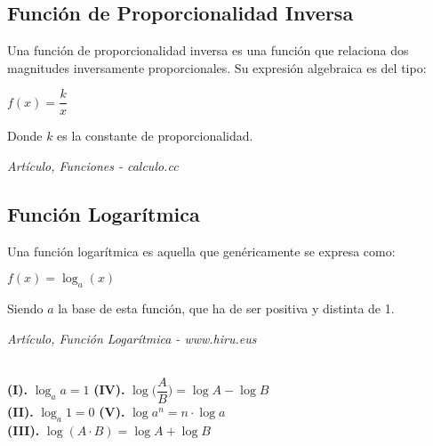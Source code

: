 \documentclass[12pt,a4paper]{book}
\begin{document}
{\begin{center}
\end{center}

\subsection{Función de Proporcionalidad Inversa}
\begin{framed}\noindent
Una función de proporcionalidad inversa es una función que relaciona dos magnitudes inversamente proporcionales. Su expresión algebraica es del tipo:
\begin{center}
$f(x)=\dfrac{k}{x}$
\end{center}
Donde $k$ es la constante de proporcionalidad.
\begin{flushright}
\textit{{\scriptsize Artículo, Funciones - calculo.cc}}
\end{flushright}
\vspace{-0.5cm}
\end{framed}
\subsection{Función Logarítmica}
\begin{framed}\noindent
Una función logarítmica es aquella que genéricamente se expresa como:
\begin{center}
$f(x)= \log_a(x)$
\end{center}
Siendo $a$ la base de esta función, que ha de ser positiva y distinta de 1. 
\begin{flushright}
\textit{{\scriptsize Artículo, Función Logarítmica - www.hiru.eus}}
\end{flushright}
\vspace{-0.5cm}
\end{framed}

\begin{framed}\noindent
{}\\${ }$\\
\textbf{(I).} $\log_a a = 1$ \hspace{4.2cm} \textbf{(IV).} $\log{\bigg( \dfrac{A}{B} \bigg)} = \log{A} - \log{B}$ \\${ }$\\
\textbf{(II).} $\log_a 1 = 0$ \hspace{4cm} \textbf{(V).} $\log a^n = n \cdot \log a$ \\${ }$\\
\textbf{(III).} $\log{(A \cdot B)} = \log{A} + \log{B}$
\end{framed}

}
\end{document}
